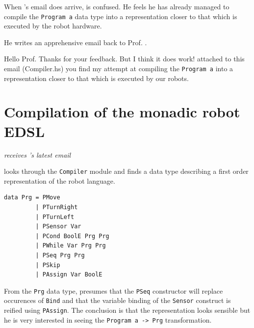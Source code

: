 When \docname{}'s email does arrive, \studname{} is confused. He feels he has already managed 
to compile the {\tt Program a} data type into a representation closer to that 
which is executed by the robot hardware. 

He writes an apprehensive email back to Prof. \docname{}. 

\vspace{5mm}

\noindent\colorbox{light-gray}{
\begin{minipage}[]{0.9\linewidth}
\noindent 
Hello Prof. \docname{} 
\newline \newline
\noindent Thanks for your feedback. But I think it does work! attached 
to this email (Compiler.hs) you find my attempt at compiling the 
{\tt Program a} into a representation closer to that which is executed 
by our robots. \newline \newline

\noindent \studname{} 
\end{minipage} 
}

\vspace{5mm}


\section{Compilation of the monadic robot EDSL} 
\emph{\docname{} receives \studname{}'s latest email}\newline \newline 

\noindent \docname{} looks through the {\tt Compiler} module and finds a data type describing
a first order representation of the robot language.

\begin{small} 
\begin{verbatim}
data Prg = PMove          
         | PTurnRight
         | PTurnLeft
         | PSensor Var    
         | PCond BoolE Prg Prg
         | PWhile Var Prg Prg 
         | PSeq Prg Prg
         | PSkip       
         | PAssign Var BoolE
\end{verbatim}
\end{small}

From the {\tt Prg} data type, \docname{} presumes that the {\tt PSeq} constructor 
will replace occurences of {\tt Bind} and that the variable binding of the 
{\tt Sensor} construct is reified using {\tt PAssign}. The conclusion is
that the representation looks sensible but he is very interested in seeing 
the {\tt Program a -> Prg} transformation. 

